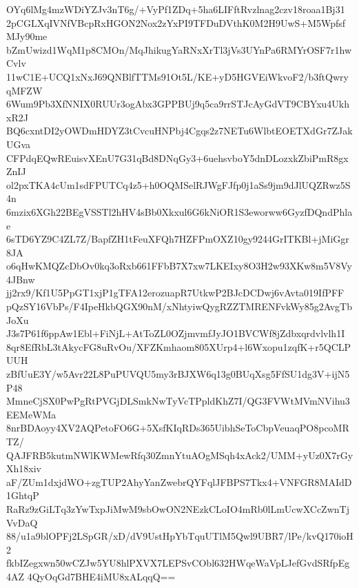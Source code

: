 OYq6lMg4mzWDiYZJv3nT6g/+VyPf1ZDq+5ha6LIFftRvzlnag2czv18roaa1Bj31
2pCGLXqIVNfVBcpRxHGON2Nox2zYxPI9TFDuDVthK0M2H9UwS+M5WpfsfMJy90me
bZmUwizd1WqM1p8CMOn/MqJhikugYaRNxXrTl3jVs3UYnPa6RMYrOSF7r1hwCvlv
11wC1E+UCQ1xNxJ69QNBlfTTMs91Ot5L/KE+yD5HGVEiWkvoF2/b3ftQwryqMFZW
6Wum9Pb3XfNNIX0RUUr3ogAbx3GPPBUj9q5ca9rrSTJcAyGdVT9CBYxu4UkhxR2J
BQ6cxntDI2yOWDmHDYZ3tCvcuHNPbj4Cgqs2z7NETu6WlbtEOETXdGr7ZJakUGva
CFPdqEQwREuisvXEnU7G31qBd8DNqGy3+6uehsvboY5dnDLozxkZbiPmR8gxZnIJ
ol2pxTKA4cUm1sdFPUTCq4z5+h0OQMSelRJWgFJfp0j1aSs9jm9dJlUQZRwz5S4n
6mzix6XGh22BEgVSSTl2hHV4sBb0Xkxul6G6kNiOR1S3eworww6GyzfDQndPhlae
6sTD6YZ9C4ZL7Z/BapfZH1tFeuXFQh7HZFPmOXZ10gy9244GrITKBl+jMiGgr8JA
o6qHwKMQZcDbOv0kq3oRxb661FFbB7X7xw7LKEIxy8O3H2w93XKw8m5V8Vy4JBnw
jj2rx9/Kf1U5PpGT1xjP1gTFA12erozuapR7UtkwP2BJcDCDwj6vAvta019IfPFF
pQzSY16VbPs/F4IpeHkbQGX90nM/xNhtyiwQygRZZTMRENFvkWy85g2AvgTbJoXu
J3s7P61f6ppAw1Ebl+FiNjL+AtToZL0OZjmvmfJyJO1BVCWf8jZdbxqrdvlvlh1I
8qr8EfRbL3tAkycFG8uRvOu/XFZKmhaom805XUrp4+l6Wxopu1zqfK+r5QCLPUUH
zBfUuE3Y/w5Avr22L8PuPUVQU5my3rBJXW6q13g0BUqXsg5FfSU1dg3V+ijN5P48
MmneCjSX0PwPgRtPVGjDLSmkNwTyVcTPpldKhZ7I/QG3FVWtMVmNVihu3EEMeWMa
8nrBDAoyy4XV2AQPetoFO6G+5XsfKIqRDs365UibhSeToCbpVeuaqPO8pcoMRTZ/
QAJFRB5kutmNWlKWMewRfq30ZmnYtuAOgMSqh4xAck2/UMM+yUz0X7rGyXh18xiv
aF/ZUm1dxjdWO+zgTUP2AhyYanZwebrQYFqlJFBPS7Tkx4+VNFGR8MAIdD1GhtqP
RaRz9zGiLTq3zYwTxpJiMwM9sbOwON2NEzkCLoIO4mRb0lLmUcwXCcZwnTjVvDaQ
88/u1a9blOPFj2LSpGR/xD/dV9UstHpYbTquUTlM5Qwl9UBR7/lPe/kvQ170ioH2
fkbIZegxwn50wCZJw5YU8hlPXVX7LEPSvCObl632HWqeWaVpLJefGvdSRfpEg4AZ
4QyOqGd7BHE4iMU8xALqqQ==
